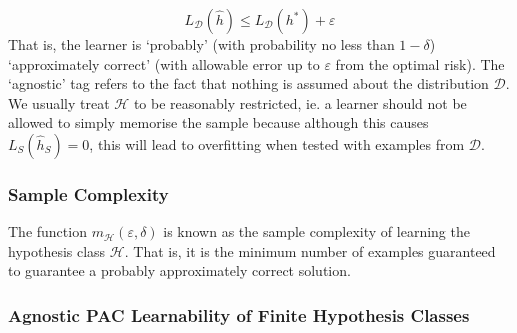 \documentclass[11pt]{report} %
\begin{document}
\begin{equation}
L_{\mathcal{D}}\left(\widehat{h}\right) \leq L_{\mathcal{D}}\left(h^{*}\right) + \varepsilon
\end{equation}
That is, the learner is `probably' (with probability no less than $1 - \delta$) `approximately correct' (with allowable error up to $\varepsilon$ from the optimal risk). The `agnostic' tag refers to the fact that nothing is assumed about the distribution $\mathcal{D}$. We usually treat $\mathcal{H}$ to be reasonably restricted, ie. a learner should not be allowed to simply memorise the sample because although this causes $L_{S}\left(\widehat{h}_{S}\right) = 0$, this will lead to overfitting when tested with examples from $\mathcal{D}$.

\subsubsection{Sample Complexity}

The function $m_{\mathcal{H}}\left(\varepsilon, \delta\right)$ is known as the sample complexity of learning the hypothesis class $\mathcal{H}$. That is, it is the minimum number of examples guaranteed to guarantee a probably approximately correct solution.

\subsubsection{Agnostic PAC Learnability of Finite Hypothesis Classes}
\end{document}
